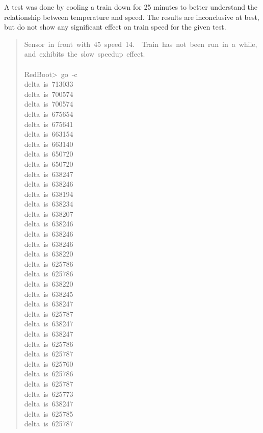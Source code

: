 \documentclass[letterpaper]{article}
\begin{document}
A test was done by cooling a train down for 25 minutes to better understand the relationship between temperature and speed.  The results are inconclusive at best, but do not show any significant effect on train speed for the given test.
%
\begin{quote}{\ttfamily \raggedright \noindent
Sensor~in~front~with~45~speed~14.~~Train~has~not~been~run~in~a~while,~and~exhibits~the~slow~speedup~effect.\\
~\\
RedBoot>~go~-c\\
delta~is~713033\\
delta~is~700574\\
delta~is~700574\\
delta~is~675654\\
delta~is~675641\\
delta~is~663154\\
delta~is~663140\\
delta~is~650720\\
delta~is~650720\\
delta~is~638247\\
delta~is~638246\\
delta~is~638194\\
delta~is~638234\\
delta~is~638207\\
delta~is~638246\\
delta~is~638246\\
delta~is~638246\\
delta~is~638220\\
delta~is~625786\\
delta~is~625786\\
delta~is~638220\\
delta~is~638245\\
delta~is~638247\\
delta~is~625787\\
delta~is~638247\\
delta~is~638247\\
delta~is~625786\\
delta~is~625787\\
delta~is~625760\\
delta~is~625786\\
delta~is~625787\\
delta~is~625773\\
delta~is~638247\\
delta~is~625785\\
delta~is~625787\\
}
\end{quote}
\end{document}
